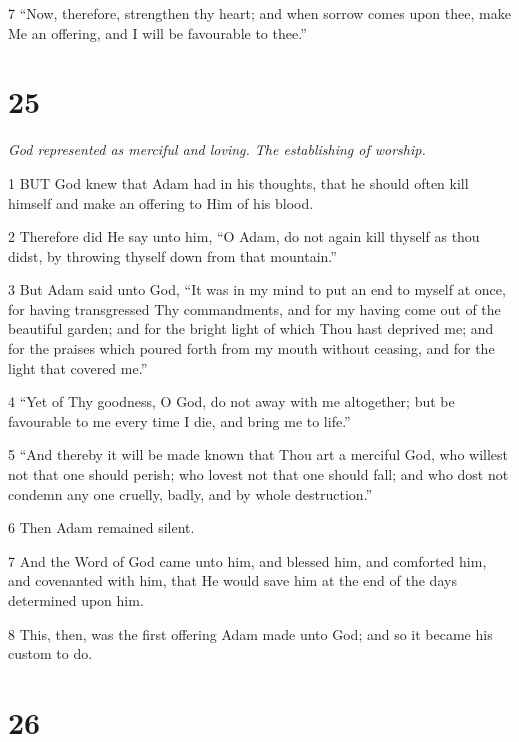\par 7 “Now, therefore, strengthen thy heart; and when sorrow comes upon thee, make Me an offering, and I will be favourable to thee.”

\chapter{25}

\par \textit{God represented as merciful and loving. The establishing of worship.}

\par 1 BUT God knew that Adam had in his thoughts, that he should often kill himself and make an offering to Him of his blood.

\par 2 Therefore did He say unto him, “O Adam, do not again kill thyself as thou didst, by throwing thyself down from that mountain.”

\par 3 But Adam said unto God, “It was in my mind to put an end to myself at once, for having transgressed Thy commandments, and for my having come out of the beautiful garden; and for the bright light of which Thou hast deprived me; and for the praises which poured forth from my mouth without ceasing, and for the light that covered me.”

\par 4 “Yet of Thy goodness, O God, do not away with me altogether; but be favourable to me every time I die, and bring me to life.”

\par 5 “And thereby it will be made known that Thou art a merciful God, who willest not that one should perish; who lovest not that one should fall; and who dost not condemn any one cruelly, badly, and by whole destruction.”

\par 6 Then Adam remained silent.

\par 7 And the Word of God came unto him, and blessed him, and comforted him, and covenanted with him, that He would save him at the end of the days determined upon him.

\par 8 This, then, was the first offering Adam made unto God; and so it became his custom to do.

\chapter{26}

